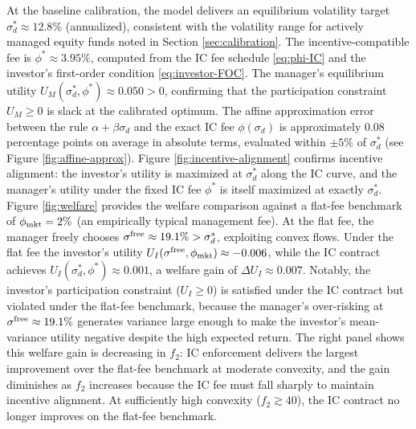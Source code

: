 At the baseline calibration, the model delivers an equilibrium
volatility target \(\sigma_d^* \approx 12.8\%\) (annualized), consistent
with the volatility range for actively managed equity funds noted in
Section \ref{sec:calibration}. The incentive-compatible fee is
\(\phi^* \approx 3.95\%\), computed from the IC fee schedule
\eqref{eq:phi-IC} and the investor's first-order condition
\eqref{eq:investor-FOC}. The manager's equilibrium utility
\(U_M(\sigma_d^*, \phi^*) \approx 0.050 > 0\), confirming that the
participation constraint \(U_M \ge 0\) is slack at the calibrated
optimum. The affine approximation error between the rule
\(\alpha + \beta\sigma_d\) and the exact IC fee \(\phi(\sigma_d)\) is
approximately 0.08 percentage points on average in absolute terms,
evaluated within \(\pm 5\%\) of \(\sigma_d^*\) (see Figure
\ref{fig:affine-approx}). Figure \ref{fig:incentive-alignment} confirms
incentive alignment: the investor's utility is maximized at
\(\sigma_d^*\) along the IC curve, and the manager's utility under the
fixed IC fee \(\phi^*\) is itself maximized at exactly \(\sigma_d^*\).
Figure \ref{fig:welfare} provides the welfare comparison against a
flat-fee benchmark of \(\phi_{\rm mkt}=2\%\) (an empirically typical
management fee). At the flat fee, the manager freely chooses
\(\sigma^{\rm free}\approx 19.1\%>\sigma_d^*\), exploiting convex flows.
Under the flat fee the investor's utility
\(U_I(\sigma^{\rm free},\phi_{\rm mkt})\approx -0.006\), while the IC
contract achieves \(U_I(\sigma_d^*,\phi^*)\approx 0.001\), a welfare
gain of \(\Delta U_I\approx 0.007\). Notably, the investor's
participation constraint (\(U_I\ge 0\)) is satisfied under the IC
contract but violated under the flat-fee benchmark, because the
manager's over-risking at \(\sigma^{\rm free}\approx 19.1\%\) generates
variance large enough to make the investor's mean-variance utility
negative despite the high expected return. The right panel shows this
welfare gain is decreasing in \(f_2\): IC enforcement delivers the
largest improvement over the flat-fee benchmark at moderate convexity,
and the gain diminishes as \(f_2\) increases because the IC fee must
fall sharply to maintain incentive alignment. At sufficiently high
convexity (\(f_2\gtrsim 40\)), the IC contract no longer improves on the
flat-fee benchmark.

